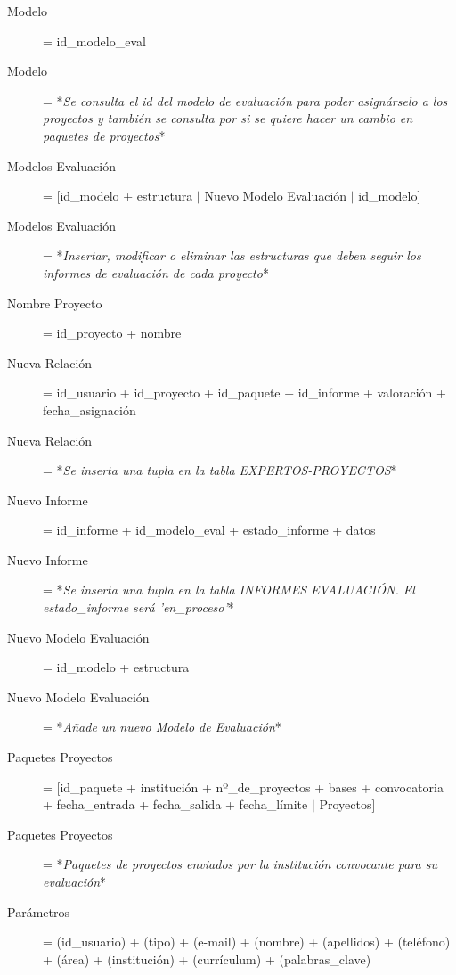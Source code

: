 \documentclass[12pt,a4paper,spanish,twoside]{book}
\begin{document}
\begin{description}
\item[Modelo] = id\_modelo\_eval

\item[Modelo] = *\emph{Se consulta el id del modelo de evaluación para poder
    asignárselo a los proyectos y también se consulta por si se quiere hacer
    un cambio en paquetes de proyectos}* 

\item[Modelos Evaluación] = [id\_modelo + estructura $\mid$ Nuevo Modelo
  Evaluación $\mid$ id\_modelo] 

\item[Modelos Evaluación] = *\emph{Insertar, modificar o eliminar las
    estructuras que deben seguir los informes de evaluación de cada
    proyecto}* 

\item[Nombre Proyecto] = id\_proyecto + nombre

\item[Nueva Relación] = id\_usuario + id\_proyecto + id\_paquete +
  id\_informe + valoración + fecha\_asignación 

\item[Nueva Relación] = *\emph{Se inserta una tupla en la tabla
    EXPERTOS-PROYECTOS}* 

\item[Nuevo Informe] = id\_informe + id\_modelo\_eval + estado\_informe + datos

\item[Nuevo Informe] = *\emph{Se inserta una tupla en la tabla INFORMES
    EVALUACIÓN. El estado\_informe será 'en\_proceso'}* 

\item[Nuevo Modelo Evaluación] = id\_modelo + estructura

\item[Nuevo Modelo Evaluación] = *\emph{Añade un nuevo Modelo de Evaluación}*

\item[Paquetes Proyectos] = [id\_paquete + institución + nº\_de\_proyectos +
  bases + convocatoria + fecha\_entrada + fecha\_salida + fecha\_límite
  $\mid$ Proyectos] 

\item[Paquetes Proyectos] = *\emph{Paquetes de proyectos enviados por la
    institución convocante para su evaluación}* 

\item[Parámetros] = (id\_usuario) + (tipo) + (e-mail) + (nombre) +
  (apellidos) + (teléfono) + (área) + (institución) + (currículum) +
  (palabras\_clave) 


\end{description}
\end{document}
